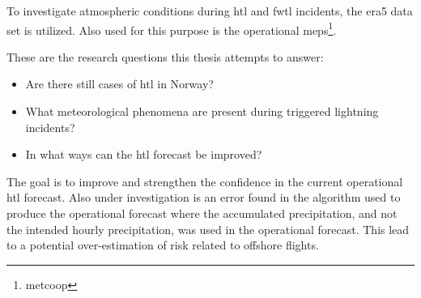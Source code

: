 To investigate atmospheric conditions during \acrshort{htl} and \acrshort{fwtl} incidents, the \acrfull{era5} data set is utilized. Also used for this purpose is the operational \acrfull{meps}\footnote{\acrfull{metcoop}}. 

These are the research questions this thesis attempts to answer:
\begin{itemize}	
    \item Are there still cases of \acrlong{htl} in Norway?
    \item What meteorological phenomena are present during triggered lightning incidents?
    \item In what ways can the \acrshort{htl} forecast be improved?
\end{itemize}

The goal is to improve and strengthen the confidence in the current operational \acrshort{htl} forecast. Also under investigation is an error found in the algorithm used to produce the operational forecast where the accumulated precipitation, and not the intended hourly precipitation, was used in the operational forecast. This lead to a potential over-estimation of risk related to offshore flights.
